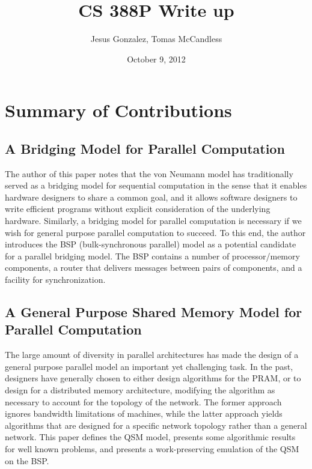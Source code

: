 \documentclass[12pt,a4paper]{article}
\author{Jesus Gonzalez, Tomas McCandless}
\title{CS 388P Write up}
\date{October 9, 2012}
\begin{document}
\maketitle
{}
\doublespace
\newpage


\section{Summary of Contributions}

\subsection{A Bridging Model for Parallel Computation \cite{Val90}}
The author of this paper notes that the von Neumann model has traditionally served as a bridging model for sequential computation in the sense that it
enables hardware designers to share a common goal, and it allows software designers to write efficient programs without explicit consideration of the
underlying hardware. Similarly, a bridging model for parallel computation is necessary if we wish for general purpose parallel computation to succeed.
To this end, the author introduces the BSP (bulk-synchronous parallel) model as a potential candidate for a parallel bridging model. The BSP contains a
number of processor/memory components, a router that delivers messages between pairs of components, and a facility for synchronization.

\subsection{A General Purpose Shared Memory Model for Parallel Computation \cite{Vlr97}}
The large amount of diversity in parallel architectures has made the design of a general purpose parallel model an important yet challenging task. In
the past, designers have generally chosen to either design algorithms for the PRAM, or to design for a distributed memory architecture, modifying the
algorithm as necessary to account for the topology of the network. The former approach ignores bandwidth limitations of machines, while the latter
approach yields algorithms that are designed for a specific network topology rather than a general network. This paper defines the QSM model, presents
some algorithmic results for well known problems, and presents a work-preserving emulation of the QSM on the BSP.
\end{document}

